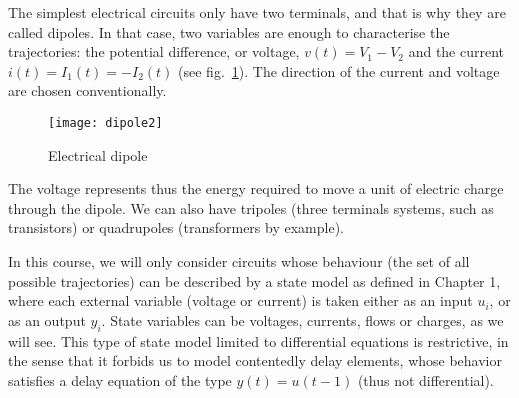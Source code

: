 The simplest electrical circuits only have two terminals, and that is why they are called dipoles. In that case, two variables are enough to characterise the trajectories: the potential difference, or voltage, $v(t)=V_1-V_2$ and the current $i(t)=I_1(t)=-I_2(t)$ (see fig.~\ref{fig:dipole}). The direction of the current and voltage are chosen conventionally.
\begin{figure}[t]
\begin{center}
\texttt{[image: dipole2]}
\caption{Electrical dipole}
\label{fig:dipole}
\end{center}
\end{figure}
The voltage represents thus the energy required to move a unit of electric charge through the dipole. We can also have tripoles (three terminals systems, such as transistors) or quadrupoles (transformers by example).

In this course, we will only consider circuits whose behaviour (the set of all possible trajectories) can be described by a state model as defined in Chapter 1, where each external variable (voltage or current) is taken either as an input $u_i$, or as an output $y_i$. State variables can be voltages, currents, flows or charges, as we will see. This type of state model limited to differential equations is restrictive, in the sense that it forbids us to model contentedly delay elements, whose behavior satisfies a delay equation of the type $y(t)=u(t-1)$ (thus not differential).

